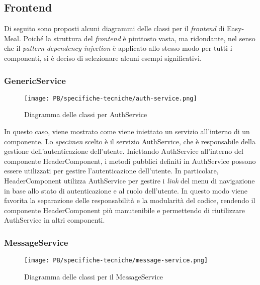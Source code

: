 \subsection{Frontend}

Di seguito sono proposti alcuni diagrammi delle classi per il \textit{frontend}
di Easy-Meal. Poiché la struttura del \textit{frontend} è piuttosto vasta, ma
ridondante, nel senso che il \textit{pattern} \textit{dependency injection} è applicato
allo stesso modo per tutti i componenti, si è deciso di selezionare alcuni
esempi significativi.

\subsubsection{GenericService}

\begin{figure}[H]
	\centering
	\texttt{[image: PB/specifiche-tecniche/auth-service.png]}
	\caption{Diagramma delle classi per AuthService}
\end{figure}

In questo caso, viene mostrato come viene iniettato un servizio all'interno di
un componente. Lo \textit{specimen} scelto è il servizio AuthService,
che è responsabile della gestione dell'autenticazione dell'utente. Iniettando
AuthService all'interno del componente HeaderComponent, i metodi pubblici
definiti in AuthService possono essere utilizzati per gestire l'autenticazione
dell'utente. In particolare, HeaderComponent utilizza AuthService per gestire i
\textit{link} del menu di navigazione in base allo stato di autenticazione e al ruolo 
dell'utente. In questo modo viene favorita la separazione delle responsabilità
e la modularità del codice, rendendo il componente HeaderComponent più
manutenibile e permettendo di riutilizzare AuthService in altri componenti.

\subsubsection{MessageService}

\begin{figure}[H]
	\centering
	\texttt{[image: PB/specifiche-tecniche/message-service.png]}
	\caption{Diagramma delle classi per il MessageService}
\end{figure}

